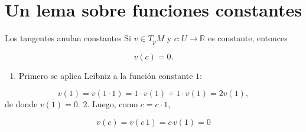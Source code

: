 \section{Un lema sobre funciones constantes}
\begin{booklemma}{Los tangentes anulan constantes}
Si $v\in T_pM$ y $c:U\to\mathbb{R}$ es constante, entonces

\[
v(c)=0.
\]
\end{booklemma}
\begin{bookproof}{}
\begin{enumerate}
\item Primero se aplica Leibniz a la función constante $1$:
\end{enumerate}
\[
v(1)=v(1\cdot 1)=1\cdot v(1)+1\cdot v(1)=2v(1),
\]
de donde $v(1)=0$. 2. Luego, como $c=c\cdot 1$,

\[
v(c)=v(c\,1)=c\,v(1)=0
\]
\bookqed
\end{bookproof}
